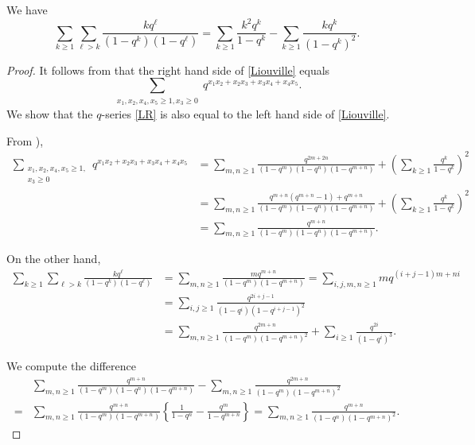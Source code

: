 \documentclass[a4paper,reqno,12pt]{amsart}
\begin{document}
\begin{lemma} \label{lemma_f1_f3} We have \begin{equation}\label{Liouville} \sum_{k\geq1}\sum_{\ell>k} \frac{k q^{\ell}}{(1-q^k)(1-q^{\ell})}= \sum_{k\geq1} \frac{k^2 q^k}{1-q^k} - \sum_{k\geq1} \frac{kq^k}{(1-q^k)^2}.\end{equation}
\end{lemma}
\begin{proof}  It follows from \cite[equation (2.1)]{Andrews} that the right hand side of \eqref{Liouville} equals \begin{equation}\label{LR}\sum_{\substack{x_1,x_2,x_4,x_5\geq 1,  {x_3}\geq0}} 
q^{x_1x_2+x_2{x_3}+{x_3}x_4+x_4x_5}.\end{equation}
We show that the $q$-series \eqref{LR} is also equal to the left hand side of \eqref{Liouville}.

    From \cite[page 123]{Andrews}), 
\begin{align*}
{\sum_{\substack{x_1,x_2,x_4,x_5\geq 1, \\ {x_3}\geq0}} 
q^{x_1x_2+x_2{x_3}+{x_3}x_4+x_4x_5}}
&=\sum_{m,n\geq1} \frac{q^{2m+2n}}{(1-q^m)(1-q^n)(1-q^{m+n})} + \left(\sum_{k\geq1}\frac{q^k}{1-q^k}\right)^2  \\
&=\sum_{m,n\geq1} \frac{q^{m+n}(q^{m+n}-1)+q^{m+n}}{(1-q^m)(1-q^n)(1-q^{m+n})} + \left(\sum_{k\geq1}\frac{q^k}{1-q^k}\right)^2  \\
&=\sum_{m,n\geq1} \frac{q^{m+n}}{(1-q^m)(1-q^n)(1-q^{m+n})}.
\end{align*}

\noindent
On the other hand,
\begin{align*}
{\sum_{k\geq1}\sum_{\ell>k} \frac{k q^{\ell}}{(1-q^k)(1-q^{\ell})} } 
&= \sum_{m,n\geq1} \frac{mq^{m+n}}{(1-q^m)(1-q^{m+n})}  = \sum_{i,j,m,n\geq1} mq^{(i+j-1)m+ni} \\
&=\sum_{i,j\geq1} \frac{q^{2i+j-1}}{(1-q^i)(1-q^{i+j-1})^2}   \\
&=\sum_{m,n\geq1} \frac{q^{2m+n}}{(1-q^m)(1-q^{m+n})^2} + \sum_{i\geq1} \frac{q^{2i}}{(1-q^i)^3}.
\end{align*}

\noindent
We compute the difference
\begin{align*}
&\sum_{m,n\geq1} \frac{q^{m+n}}{(1-q^m)(1-q^n)(1-q^{m+n})}
- \sum_{m,n\geq1} \frac{q^{2m+n}}{(1-q^m)(1-q^{m+n})^2} \\
=& \sum_{m,n\geq1}  \frac{q^{m+n}}{(1-q^m)(1-q^{m+n})} \left\{\frac1{1-q^n}-\frac{q^m}{1-q^{m+n}} \right\}  
= \sum_{m,n\geq1} \frac{q^{m+n}}{(1-q^n)(1-q^{m+n})^2}.
\end{align*}



\end{proof}
\end{document}
